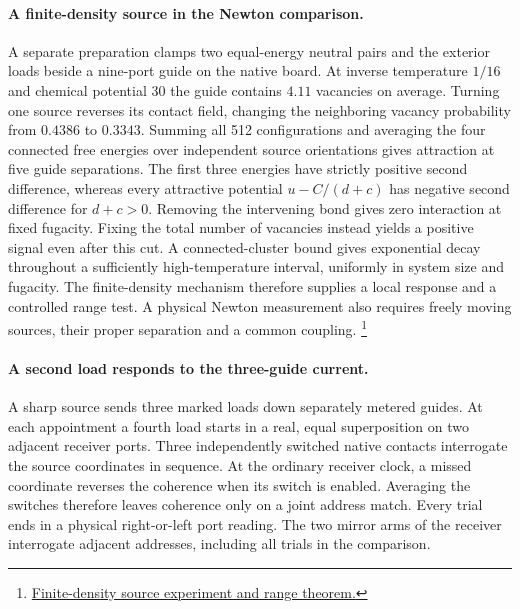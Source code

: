 \documentclass[11pt]{article}
\begin{document}
\paragraph{A finite-density source in the Newton comparison.}
A separate preparation clamps two equal-energy neutral pairs and the
exterior loads beside a nine-port guide on the native board. At inverse temperature $1/16$ and
chemical potential $30$ the guide contains $4.11$ vacancies on average.
Turning one source reverses its contact field, changing the neighboring
vacancy probability from $0.4386$ to $0.3343$. Summing all 512
configurations and averaging the four connected free energies over
independent source orientations gives attraction at five guide
separations. The first three energies have strictly positive second
difference, whereas every attractive potential $u-C/(d+c)$ has
negative second difference for $d+c>0$. Removing the intervening
bond gives zero interaction at fixed fugacity. Fixing the total number
of vacancies instead yields a positive signal even after this cut.
A connected-cluster bound gives exponential decay throughout a
sufficiently high-temperature interval, uniformly in system size
and fugacity. The finite-density mechanism therefore supplies a local
response and a controlled range test. A physical Newton measurement
also requires freely moving sources, their proper separation and a
common coupling.
\footnote{\href{https://github.com/FloatingPragma/observer-patch-holography/tree/main/model/candidate_laws/interval_echo/openwave/row_26_newton/mobile_mediator/finite_density}{Finite-density source experiment and range theorem.}}

\paragraph{A second load responds to the three-guide current.}
A sharp source sends three marked loads down separately metered guides.
At each appointment a fourth load starts in a real, equal superposition
on two adjacent receiver ports. Three independently switched native
contacts interrogate the source coordinates in sequence. At the
ordinary receiver clock, a missed coordinate reverses the coherence
when its switch is enabled. Averaging the switches therefore leaves
coherence only on a joint address match. Every trial ends in a physical
right-or-left port reading. The two mirror arms of the receiver
interrogate adjacent addresses, including all trials in the comparison.
\end{document}
